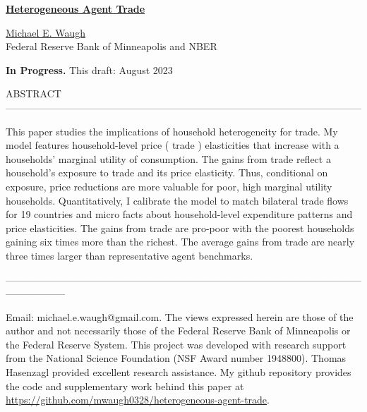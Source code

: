 \documentclass[12pt,pdftex]{article}
\begin{document}
\begin{onehalfspacing}

{\large \textbf{\href{https://www.waugheconomics.com/uploads/2/2/5/6/22563786/heterogeneous-agent-trade.pdf}{Heterogeneous Agent Trade}}}

\vspace{0.5cm}

\href{http://www.waugheconomics.com/}{Michael E. Waugh} \\ Federal Reserve Bank of Minneapolis and NBER

\vspace{0.5cm}

\textbf{In Progress.} This draft: August 2023

\vspace{1.5cm}


\normalsize

ABSTRACT ------------------------------------------------------------------------------------------------------------

This paper studies the implications of household heterogeneity for trade. My model features household-level price ( trade ) elasticities that increase with a households' marginal utility of consumption. The gains from trade reflect a household's exposure to trade and its price elasticity. Thus, conditional on exposure, price reductions are more valuable for poor, high marginal utility households. Quantitatively, I calibrate the model to match bilateral trade flows for 19 countries and micro facts about household-level expenditure patterns and price elasticities. The gains from trade are pro-poor with the poorest households gaining six times more than the richest. The average gains from trade are nearly three times larger than representative agent benchmarks.

------------------------------------------------------------------------------------------------------------------------------
%

\vspace{6.0cm}

\footnotesize Email: michael.e.waugh@gmail.com. The views expressed herein are those of the author and not necessarily those of the Federal Reserve Bank of Minneapolis or the Federal Reserve System. This project was developed with research support from the National Science Foundation (NSF Award number 1948800). Thomas Hasenzagl provided excellent research assistance. My github repository provides the code and supplementary work behind this paper at \url{https://github.com/mwaugh0328/heterogeneous-agent-trade}.


\end{onehalfspacing}
\end{document}
